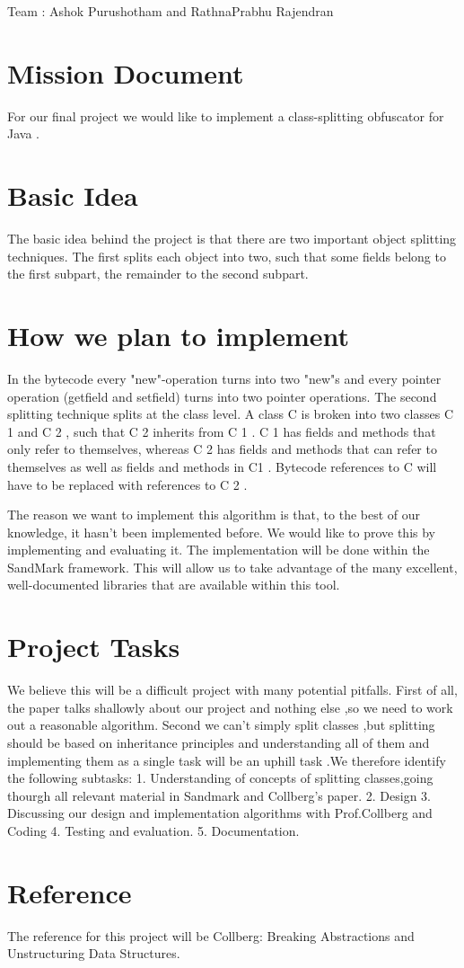 %
	  {Team : Ashok Purushotham and RathnaPrabhu Rajendran}

\section{Mission Document}
	For our final project we would like to implement a class-splitting
obfuscator for Java . 

\section{Basic Idea}
The basic idea behind the project is that
there are two important object  splitting techniques. The first
splits each object into two, such that some fields belong to the
first subpart, the remainder to the second subpart.


\section{How we plan to implement}
        In the bytecode every "new"-operation turns into two "new"s
and every pointer operation (getfield and setfield) turns into two
pointer operations. The second splitting technique splits at the
class level. A class C is broken into two classes C 1 and C 2 ,
such that C 2 inherits from C 1 . C 1 has fields and methods that
only refer to themselves, whereas C 2 has fields and methods that
can refer to themselves as well as fields and methods in C1 .
Bytecode references to C will have to be replaced with references
to C 2 .

        The reason we want to implement this algorithm is that, to
the best of our knowledge, it hasn't been implemented before. We
would like to prove this by implementing and evaluating it. The
implementation will be done within the SandMark framework. This will
allow us to take advantage of the many excellent, well-documented
libraries that are available within this tool.

\section {Project Tasks}
        We believe this will be a difficult project with many potential
pitfalls. First of all, the paper talks shallowly about our project and
nothing else ,so we need to work out a reasonable algorithm. Second we
can't simply split classes ,but splitting should be based on inheritance
principles and understanding all of them and implementing them as a single
task will be an uphill task .We therefore identify the following subtasks:
1. Understanding of concepts of splitting classes,going thourgh all
   relevant material in Sandmark and Collberg's paper.
2. Design
3. Discussing our design and implementation algorithms with Prof.Collberg
   and Coding
4. Testing and evaluation.
5. Documentation.

\section{Reference}
        The reference for this project will be Collberg: Breaking
Abstractions and Unstructuring Data Structures.

